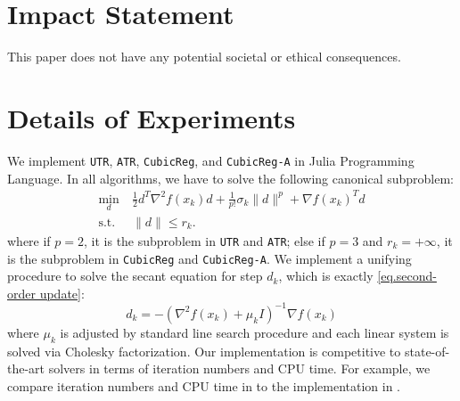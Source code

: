 \documentclass{article}
\theoremstyle{plain}
\theoremstyle{definition}
\theoremstyle{remark}
\newcommand{\utr}{\texttt{UTR}}
\newcommand{\atr}{\texttt{ATR}}
\newcommand{\arc}{\texttt{CubicReg}}
\newcommand{\arca}{\texttt{CubicReg-A}}
\begin{document}
\newpage
\section*{Impact Statement}
This paper does not have any potential societal or ethical consequences.


\nocite{langley00}





\newpage
\appendix
\onecolumn
\section{Details of Experiments}\label{sec.experiments.details}

We implement \utr{}, \atr{}, \arc{}, and \arca{} in Julia Programming Language. In all algorithms, we have to solve the following canonical subproblem:
\begin{equation}
    \begin{aligned}
        \min_d ~              & \frac{1}{2}d^T\nabla^2 f(x_k)d + \frac{1}{p!}\sigma_k\|d\|^p + \nabla f(x_k)^T d \\
        \operatorname{s.t.} ~ & \|d\| \le r_k.
    \end{aligned}
\end{equation}
where if $p=2$, it is the subproblem in \utr{} and \atr{}; else if $p=3$ and $r_k = +\infty$, it is the subproblem in \arc{} and \arca{}. We implement a unifying procedure to solve the secant equation for step $d_k$, which is exactly \eqref{eq.second-order update}:
\begin{equation}
    d_k = -\left(\nabla^2 f(x_k) + \mu_k I\right)^{-1}\nabla f(x_k)
\end{equation}
where $\mu_k$ is adjusted by standard line search procedure and each linear system is solved via Cholesky factorization. Our implementation is competitive to state-of-the-art solvers in terms of iteration numbers and CPU time. For example, we compare iteration numbers and CPU time in  to the implementation in \cite{doikov_super-universal_2024}.
\end{document}
